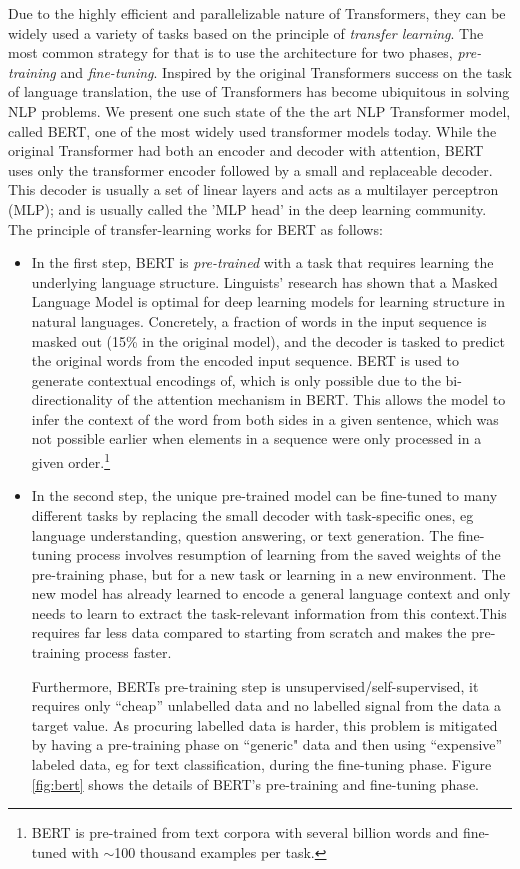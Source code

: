 Due to the highly efficient and parallelizable nature of Transformers, they can be widely used a variety of tasks based on the principle of \emph{transfer learning}. The most common strategy for that is to use the architecture for two phases, \emph{pre-training} and \emph{fine-tuning}. Inspired by the original Transformers success on the task of language translation, the use of Transformers has become ubiquitous in solving NLP problems. We present one such state of the the art NLP Transformer model, 
called BERT\cite{devlinBERTPretrainingDeep2019}, one of the most widely used transformer models today.
While the original Transformer had both an encoder and decoder with attention, BERT uses only the transformer encoder followed by a small and replaceable decoder. This decoder is usually a set of linear layers and acts as a multilayer perceptron (MLP); and is usually called the 'MLP head' in the deep learning community. The principle of transfer-learning works for BERT as follows:

\begin{itemize}
\item In the first step, BERT is \emph{pre-trained} with a task that requires learning the underlying language structure. Linguists' research has shown that a Masked Language Model is optimal for deep learning models for learning structure in natural languages.\cite{wettigShouldYouMask}
Concretely, a fraction of words in the input sequence is masked out (15\% in the original model), and the decoder is tasked to predict the original words from the encoded input sequence.
BERT is used to generate contextual encodings of, which is only possible due to the bi-directionality of the attention mechanism in BERT. This allows the model to infer the context of the word from both sides in a given sentence, which was not possible earlier when elements in a sequence were only processed in a given order.\footnote{
    BERT is pre-trained from text corpora with several billion words and fine-tuned with $\sim$100 thousand examples per task.
}

\item In the second step, the unique pre-trained model can be fine-tuned to many different tasks by replacing the small decoder with task-specific ones, eg language understanding, question answering, or text generation.
The fine-tuning process involves resumption of learning from the saved weights of the pre-training phase, but for a new task or learning in a new environment. The new model has already learned to encode a general language context and only needs to learn to extract the task-relevant information from this context.This requires far less data compared to starting from scratch and makes the pre-training process faster.

Furthermore, BERTs pre-training step is unsupervised/self-supervised, \ie it requires only ``cheap'' unlabelled data and no labelled signal from the data a target value. As procuring labelled data is harder, this problem is mitigated by having a pre-training phase on ``generic" data and then using 
``expensive'' labeled data, eg for text classification, during the fine-tuning phase. Figure \ref{fig:bert} shows the details of BERT's pre-training and fine-tuning phase.
\end{itemize}

